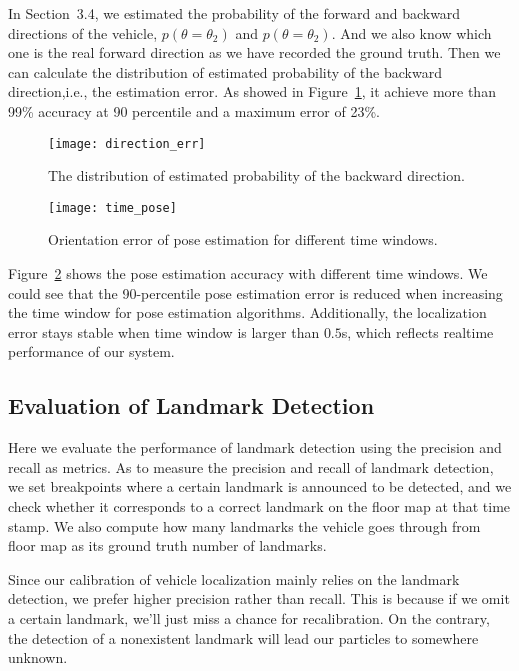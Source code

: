 
In Section~3.4, we estimated the probability of the forward and backward directions of the vehicle, $p(\theta=\theta_2)$ and ${p(\theta=\theta_2)}$. And we also know which one is the real forward direction as we have recorded the ground truth. Then we can calculate the distribution of estimated probability of the backward direction,i.e., the estimation error. As showed in Figure~\ref{pix:direction_err}, it achieve more than 99\% accuracy at 90 percentile and a maximum error of 23\%.
\begin{figure}[h]
  \centering
  \texttt{[image: direction\_err]}\\
  \caption{The distribution of estimated probability of the backward direction.}\label{pix:direction_err}
\end{figure}

\begin{figure}[h]
  \centering
  \texttt{[image: time\_pose]}\\
  \caption{Orientation error of pose estimation for different time windows.}\label{pix:time_pose}
\end{figure}

Figure~\ref{pix:time_pose} shows the pose estimation accuracy with different time windows. We could see that the 90-percentile pose estimation error is reduced when increasing the time window for pose estimation algorithms. Additionally, the localization error stays stable when time window is larger than $0.5$s, which reflects realtime performance of our system.

\subsection{Evaluation of Landmark Detection}

Here we evaluate the performance of landmark detection using the precision and recall as metrics.
As to measure the precision and recall of landmark detection, we set breakpoints where a certain landmark is announced to be detected, and we check whether it corresponds to a correct landmark on the floor map at that time stamp. We also compute how many landmarks the vehicle goes through from floor map as its ground truth number of landmarks.

Since our calibration of vehicle localization mainly relies on the landmark detection, we prefer higher precision rather than recall. This is because if we omit a certain landmark, we'll just miss a chance for recalibration. On the contrary, the detection of a nonexistent landmark will lead our particles to somewhere unknown.

